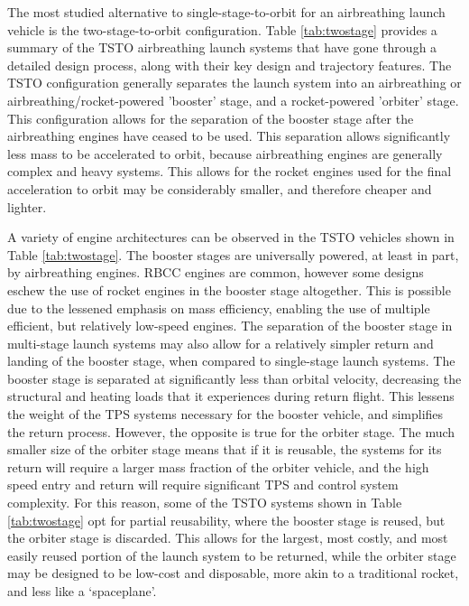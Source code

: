 The most studied alternative to single-stage-to-orbit for an airbreathing launch vehicle is the two-stage-to-orbit configuration. Table \ref{tab:twostage} provides a summary of the TSTO airbreathing launch systems that have gone through a detailed design process, along with their key design and trajectory features. The TSTO configuration generally separates the launch system into an airbreathing or airbreathing/rocket-powered 'booster' stage, and a rocket-powered 'orbiter' stage. This configuration allows for the separation of the booster stage after the airbreathing engines have ceased to be used. This separation allows significantly less mass to be accelerated to orbit, because airbreathing engines are generally complex and heavy systems. This allows for the rocket engines used for the final acceleration to orbit may be considerably smaller, and therefore cheaper and lighter. 

A variety of engine architectures can be observed in the TSTO vehicles shown in Table \ref{tab:twostage}. The booster stages are universally powered, at least in part, by airbreathing engines. RBCC engines are common, however some designs eschew the use of rocket engines in the booster stage altogether\cite{Eklund2012,Aberleen,Takahashi1997,Mehta2001}. This is possible due to the lessened emphasis on mass efficiency, enabling the use of multiple efficient, but relatively low-speed engines.
The separation of the booster stage in multi-stage launch systems may also allow for a relatively simpler return and landing of the booster stage, when compared to single-stage launch systems. The booster stage is separated at significantly less than orbital velocity, decreasing the structural and heating loads that it experiences during return flight. This lessens the weight of the TPS systems necessary for the booster vehicle, and simplifies the return process.
However, the opposite is true for the orbiter stage. The much smaller size of the orbiter stage means that if it is reusable, the systems for its return will require a larger mass fraction of the orbiter vehicle, and the high speed entry and return will require significant TPS and control system complexity. 
For this reason, some of the TSTO systems shown in Table \ref{tab:twostage} opt for partial reusability\cite{Germain2001,Aberleen,Takahashi1997}, where the booster stage is reused, but the orbiter stage is discarded. This allows for the largest, most costly, and most easily reused portion of the launch system to be returned, while the orbiter stage may be designed to be low-cost and disposable, more akin to a traditional rocket, and less like a `spaceplane'. 


